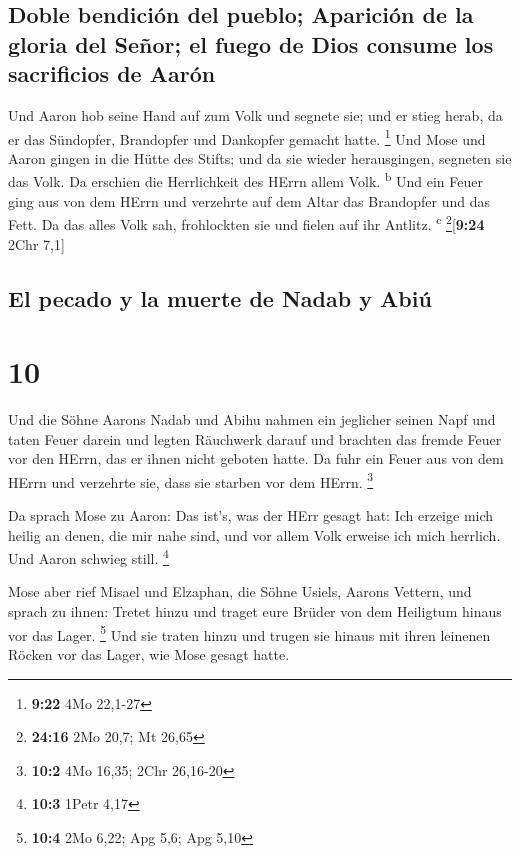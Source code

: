 \hypertarget{doble-bendiciuxf3n-del-pueblo-apariciuxf3n-de-la-gloria-del-seuxf1or-el-fuego-de-dios-consume-los-sacrificios-de-aaruxf3n}{%
\subsection{Doble bendición del pueblo; Aparición de la gloria del
Señor; el fuego de Dios consume los sacrificios de
Aarón}\label{doble-bendiciuxf3n-del-pueblo-apariciuxf3n-de-la-gloria-del-seuxf1or-el-fuego-de-dios-consume-los-sacrificios-de-aaruxf3n}}

 Und Aaron hob seine Hand auf zum Volk und segnete sie;
und er stieg herab, da er das Sündopfer, Brandopfer und Dankopfer
gemacht hatte. \footnote{\textbf{9:22} 4Mo 22,1-27}  Und
Mose und Aaron gingen in die Hütte des Stifts; und da sie wieder
herausgingen, segneten sie das Volk. Da erschien die Herrlichkeit des
HErrn allem Volk. \textsuperscript{b}  Und ein Feuer ging
aus von dem HErrn und verzehrte auf dem Altar das Brandopfer und das
Fett. Da das alles Volk sah, frohlockten sie und fielen auf ihr Antlitz.
\textsuperscript{c} \footnote{\textbf{24:16} 2Mo 20,7; Mt 26,65}{[}\textbf{9:24}
2Chr 7,1{]}

\hypertarget{el-pecado-y-la-muerte-de-nadab-y-abiuxfa}{%
\subsection{El pecado y la muerte de Nadab y
Abiú}\label{el-pecado-y-la-muerte-de-nadab-y-abiuxfa}}

\hypertarget{section-9}{%
\section{10}\label{section-9}}

 Und die Söhne Aarons Nadab und Abihu nahmen ein jeglicher
seinen Napf und taten Feuer darein und legten Räuchwerk darauf und
brachten das fremde Feuer vor den HErrn, das er ihnen nicht geboten
hatte.  Da fuhr ein Feuer aus von dem HErrn und verzehrte
sie, dass sie starben vor dem HErrn. \footnote{\textbf{10:2} 4Mo 16,35;
  2Chr 26,16-20}

 Da sprach Mose zu Aaron: Das ist's, was der HErr gesagt
hat: Ich erzeige mich heilig an denen, die mir nahe sind, und vor allem
Volk erweise ich mich herrlich. Und Aaron schwieg still. \footnote{\textbf{10:3}
  1Petr 4,17}

 Mose aber rief Misael und Elzaphan, die Söhne Usiels,
Aarons Vettern, und sprach zu ihnen: Tretet hinzu und traget eure Brüder
von dem Heiligtum hinaus vor das Lager. \footnote{\textbf{10:4} 2Mo
  6,22; Apg 5,6; Apg 5,10}  Und sie traten hinzu und
trugen sie hinaus mit ihren leinenen Röcken vor das Lager, wie Mose
gesagt hatte.

